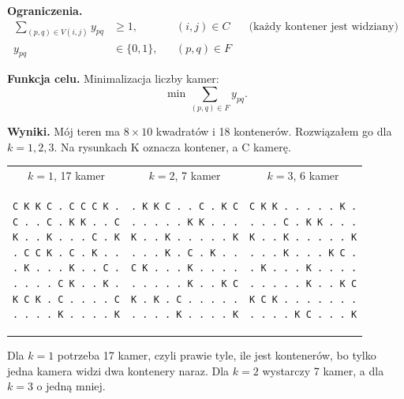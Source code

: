 \documentclass[11pt,a4paper]{article}
\begin{document}
\textbf{Ograniczenia.}
\begin{align*}
\sum_{(p,q)\in V(i,j)} y_{pq} &\ge 1, && (i,j)\in C && \text{(każdy kontener jest widziany)}\\
y_{pq} &\in\{0,1\}, && (p,q)\in F
\end{align*}

\textbf{Funkcja celu.} Minimalizacja liczby kamer:
\[ \min \sum_{(p,q)\in F} y_{pq}. \]

\textbf{Wyniki.} Mój teren ma $8\times10$ kwadratów i 18 kontenerów. Rozwiązałem go dla $k=1,2,3$. Na rysunkach K oznacza kontener, a C kamerę.

{\small
\begin{center}
\begin{tabular}{ccc}
$k=1$, 17 kamer & $k=2$, 7 kamer & $k=3$, 6 kamer \\
\begin{minipage}[t]{0.3\textwidth}\centering
\begin{verbatim}
C K K C . C C C K .
C . . C . K K . . C
K . . K . . . C . K
. C C K . C . K . .
. K . . . K . . C .
. . . . C K . . K .
K C K . C . . . . C
. . . . K . . . . K
\end{verbatim}
\end{minipage} &
\begin{minipage}[t]{0.3\textwidth}\centering
\begin{verbatim}
. K K C . . C . K C
. . . . . K K . . .
K . . K . . . . . K
. . . K . C . K . .
C K . . . K . . . .
. . . . . K . . K C
K . K . C . . . . .
. . . . K . . . . K
\end{verbatim}
\end{minipage} &
\begin{minipage}[t]{0.3\textwidth}\centering
\begin{verbatim}
C K K . . . . . K .
. . . C . K K . . .
K . . K . . . . . K
. . . K . . . K C .
. K . . . K . . . .
. . . . . K . . K C
K C K . . . . . . .
. . . . K C . . . K
\end{verbatim}
\end{minipage}
\end{tabular}
\end{center}
}

Dla $k=1$ potrzeba 17 kamer, czyli prawie tyle, ile jest kontenerów, bo tylko jedna kamera widzi dwa kontenery naraz. Dla $k=2$ wystarczy 7 kamer, a dla $k=3$ o jedną mniej.
\end{document}
